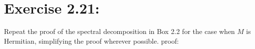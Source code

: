 \section{\Large Exercise 2.21:}
Repeat the proof of the spectral decomposition in Box 2.2 for the case
when $M$ is Hermitian, simplifying the proof wherever possible.
\newline
{\large proof:}

